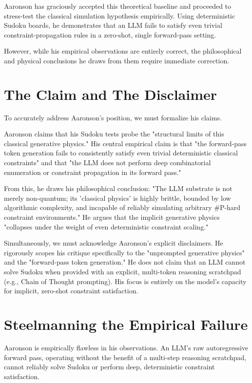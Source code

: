\documentclass[12pt,a4paper]{article}
\begin{document}
Aaronson \citep{aaronson2026_classical} has graciously accepted this theoretical baseline and proceeded to stress-test the classical simulation hypothesis empirically. Using deterministic Sudoku boards, he demonstrates that an LLM fails to satisfy even trivial constraint-propagation rules in a zero-shot, single forward-pass setting.

However, while his empirical observations are entirely correct, the philosophical and physical conclusions he draws from them require immediate correction.

\section{The Claim and The Disclaimer}

To accurately address Aaronson's position, we must formalize his claims.

Aaronson claims that his Sudoku tests probe the "structural limits of this classical generative physics." His central empirical claim is that "the forward-pass token generation fails to consistently satisfy even trivial deterministic classical constraints" and that "the LLM does not perform deep combinatorial enumeration or constraint propagation in its forward pass."

From this, he draws his philosophical conclusion: "The LLM substrate is not merely non-quantum; its 'classical physics' is highly brittle, bounded by low algorithmic complexity, and incapable of reliably simulating arbitrary \#P-hard constraint environments." He argues that the implicit generative physics "collapses under the weight of even deterministic constraint scaling."

Simultaneously, we must acknowledge Aaronson's explicit disclaimers. He rigorously scopes his critique specifically to the "unprompted generative physics" and the "forward-pass token generation." He does not claim that an LLM cannot solve Sudoku when provided with an explicit, multi-token reasoning scratchpad (e.g., Chain of Thought prompting). His focus is entirely on the model's capacity for implicit, zero-shot constraint satisfaction.

\section{Steelmanning the Empirical Failure}

Aaronson is empirically flawless in his observations. An LLM's raw autoregressive forward pass, operating without the benefit of a multi-step reasoning scratchpad, cannot reliably solve Sudoku or perform deep, deterministic constraint satisfaction.
\end{document}
